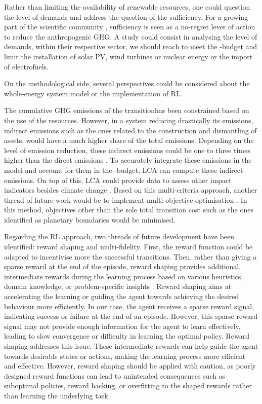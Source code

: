 Rather than limiting the availability of renewable resources, one could question the level of demands and address the question of the sufficiency. For a growing part of the scientific community \cite{o2018good}, sufficiency is seen as a no-regret lever of action to reduce the anthropogenic \gls{GHG}. A study could consist in analysing the level of demands, within their respective sector, we should reach to meet the -budget and limit the installation of solar PV, wind turbines or nuclear energy or the import of electrofuels.

On the methodological side, several perspectives could be considered about the whole-energy system model or the implementation of \gls{RL}.

The cumulative \acrfull{GHG} emissions of the transitionhas been constrained based on the use of the resources. However, in a system reducing drastically its emissions, indirect emissions such as the ones related to the construction and dismantling of assets, would have a much higher share of the total emissions. Depending on the level of emission reduction, these indirect emissions could be one to three times higher than the direct emissions \cite{blanco2020life}. To accurately integrate these emissions in the model and account for them in the -budget, \gls{LCA} can compute these indirect emissions. On top of this, \gls{LCA} could provide data to assess other impact indicators besides climate change \cite{astudillo2018integrating}. Based on this multi-criteria approach, another thread of future work would be to implement multi-objective optimisation \cite{dubois2023multi}. In this method, objectives other than the sole total transition cost such as the ones identified as planetary boundaries \cite{richardson2023earth} would be minimised.

Regarding the \gls{RL} approach, two threads of future development have been identified: reward shaping and multi-fidelity.  First, the reward function could be adapted to incentivise more the successful transitions. Then, rather than giving a sparse reward at the end of the episode, reward shaping provides additional, intermediate rewards during the learning process based on various heuristics, domain knowledge, or problem-specific insights \cite{hu2020learning}. Reward shaping aims at accelerating the learning or guiding the agent towards achieving the desired behaviour more efficiently. In our case, the agent receives a sparse reward signal, indicating success or failure at the end of an episode. However, this sparse reward signal may not provide enough information for the agent to learn effectively, leading to slow convergence or difficulty in learning the optimal policy. Reward shaping addresses this issue. These intermediate rewards can help guide the agent towards desirable states or actions, making the learning process more efficient and effective. However, reward shaping should be applied with caution, as poorly designed reward functions can lead to unintended consequences such as suboptimal policies, reward hacking, or overfitting to the shaped rewards rather than learning the underlying task.  

